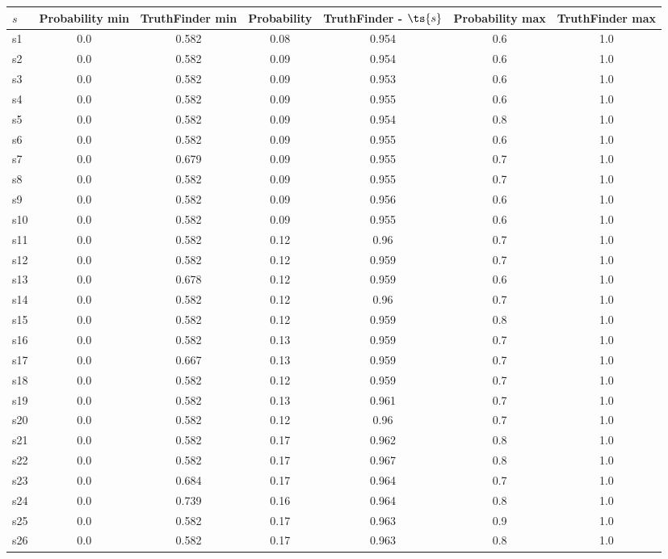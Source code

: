 \documentclass{article}
\begin{document}
\noindent\begin{tabular}{|l|c|c|c|c|c|c|}
\hline
$s$& Probability min & TruthFinder min & Probability & TruthFinder - $\ts{s}$ & Probability max & TruthFinder max\\
\hline
s1 &0.0 & 0.582 & 0.08 & 0.954 & 0.6 & 1.0\\
\hline
s2 &0.0 & 0.582 & 0.09 & 0.954 & 0.6 & 1.0\\
\hline
s3 &0.0 & 0.582 & 0.09 & 0.953 & 0.6 & 1.0\\
\hline
s4 &0.0 & 0.582 & 0.09 & 0.955 & 0.6 & 1.0\\
\hline
s5 &0.0 & 0.582 & 0.09 & 0.954 & 0.8 & 1.0\\
\hline
s6 &0.0 & 0.582 & 0.09 & 0.955 & 0.6 & 1.0\\
\hline
s7 &0.0 & 0.679 & 0.09 & 0.955 & 0.7 & 1.0\\
\hline
s8 &0.0 & 0.582 & 0.09 & 0.955 & 0.7 & 1.0\\
\hline
s9 &0.0 & 0.582 & 0.09 & 0.956 & 0.6 & 1.0\\
\hline
s10 &0.0 & 0.582 & 0.09 & 0.955 & 0.6 & 1.0\\
\hline
s11 &0.0 & 0.582 & 0.12 & 0.96 & 0.7 & 1.0\\
\hline
s12 &0.0 & 0.582 & 0.12 & 0.959 & 0.7 & 1.0\\
\hline
s13 &0.0 & 0.678 & 0.12 & 0.959 & 0.6 & 1.0\\
\hline
s14 &0.0 & 0.582 & 0.12 & 0.96 & 0.7 & 1.0\\
\hline
s15 &0.0 & 0.582 & 0.12 & 0.959 & 0.8 & 1.0\\
\hline
s16 &0.0 & 0.582 & 0.13 & 0.959 & 0.7 & 1.0\\
\hline
s17 &0.0 & 0.667 & 0.13 & 0.959 & 0.7 & 1.0\\
\hline
s18 &0.0 & 0.582 & 0.12 & 0.959 & 0.7 & 1.0\\
\hline
s19 &0.0 & 0.582 & 0.13 & 0.961 & 0.7 & 1.0\\
\hline
s20 &0.0 & 0.582 & 0.12 & 0.96 & 0.7 & 1.0\\
\hline
s21 &0.0 & 0.582 & 0.17 & 0.962 & 0.8 & 1.0\\
\hline
s22 &0.0 & 0.582 & 0.17 & 0.967 & 0.8 & 1.0\\
\hline
s23 &0.0 & 0.684 & 0.17 & 0.964 & 0.7 & 1.0\\
\hline
s24 &0.0 & 0.739 & 0.16 & 0.964 & 0.8 & 1.0\\
\hline
s25 &0.0 & 0.582 & 0.17 & 0.963 & 0.9 & 1.0\\
\hline
s26 &0.0 & 0.582 & 0.17 & 0.963 & 0.8 & 1.0\\

\end{tabular}
\end{document}

